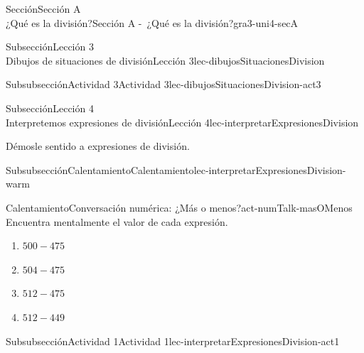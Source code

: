 \begin{sectionptx}{Sección}{{\Large Sección A\\}¿Qué es la división?}{}{Sección A -~¿Qué es la división?}{}{}{gra3-uni4-secA}
\begin{subsectionptx}{Subsección}{{\normalsize Lección 3\\[-0.05cm]}Dibujos de situaciones de división}{}{Lección 3}{}{}{lec-dibujosSituacionesDivision}
\begin{subsubsectionptx}{Subsubsección}{Actividad 3}{}{Actividad 3}{}{}{lec-dibujosSituacionesDivision-act3}
\end{subsubsectionptx}
\end{subsectionptx}
%
%
\typeout{************************************************}
\typeout{************************************************}
%
\clearpage
\begin{subsectionptx}{Subsección}{{\normalsize Lección 4\\[-0.05cm]}Interpretemos expresiones de división}{}{Lección 4}{}{}{lec-interpretarExpresionesDivision}
\begin{introduction}{}%
Démosle sentido a expresiones de división.%
\end{introduction}%
%
%
\typeout{************************************************}
\typeout{************************************************}
%
\begin{subsubsectionptx}{Subsubsección}{Calentamiento}{}{Calentamiento}{}{}{lec-interpretarExpresionesDivision-warm}
\begin{exploration}{Calentamiento}{Conversación numérica: ¿Más o menos?}{act-numTalk-masOMenos}%
Encuentra mentalmente el valor de cada expresión.%
%
\begin{enumerate}[label={\Alph*.}]
\item{}\(\displaystyle 500 - 475\)%
\item{}\(\displaystyle 504 - 475\)%
\item{}\(\displaystyle 512 - 475\)%
\item{}\(\displaystyle 512 - 449\)%
\end{enumerate}
\end{exploration}%
\end{subsubsectionptx}
%
%
%
%
%
%
%
\typeout{************************************************}
\typeout{************************************************}
%
\begin{subsubsectionptx}{Subsubsección}{Actividad 1}{}{Actividad 1}{}{}{lec-interpretarExpresionesDivision-act1}

\end{subsubsectionptx}
\end{subsectionptx}
\end{sectionptx}
